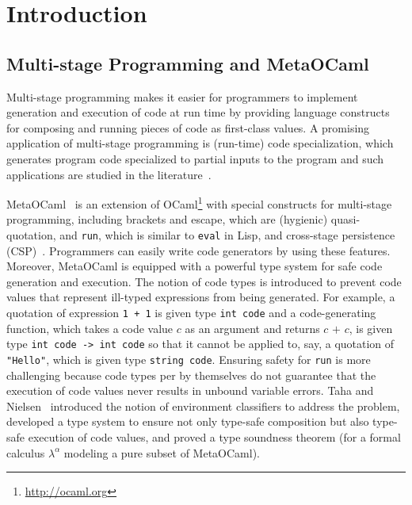 
\section{Introduction}
\label{sec:intro}

\subsection{Multi-stage Programming and MetaOCaml}

Multi-stage programming makes it easier for programmers to implement
generation and execution of code at run time by providing language
constructs for composing and running pieces of code as first-class
values.  A promising application of multi-stage programming is
(run-time) code specialization, which generates program code
specialized to partial inputs to the program and such applications are
studied in the literature~\cite{8384206,mainland2012metahaskell,taha2007gentle}.

MetaOCaml~\cite{calcagno2003implementing,oleg2014} is an extension of
OCaml\footnote{\url{http://ocaml.org}} with special constructs for
multi-stage programming, including brackets and escape, which are
(hygienic) quasi-quotation, and \texttt{run}, which is similar to
\texttt{eval} in Lisp, and cross-stage persistence
(CSP)~\cite{MetaML}.  Programmers can easily write code generators by
using these features.  Moreover, MetaOCaml is equipped with a powerful
type system for safe code generation and execution.  The notion of
code types is introduced to prevent code values that represent
ill-typed expressions from being generated.  For example, a quotation
of expression \texttt{1 + 1} is given type \texttt{int code}
and a code-generating function, which takes a code value \(c\) as an
argument and returns \(c \texttt{ + } c\), is given type \texttt{int
  code -> int code} so that it cannot be applied to, say, a quotation
of \texttt{"Hello"}, which is given type \texttt{string
  code}.  Ensuring safety for \verb|run| is more challenging because
code types per by themselves do not guarantee that the execution of code values never
results in unbound variable errors.  Taha and
Nielsen~\cite{taha2003environment} introduced the notion of
environment classifiers to address the problem, developed a type
system to ensure not only type-safe composition but also type-safe
execution of code values, and proved a type soundness theorem (for a formal calculus \(\lambda^\alpha\) modeling a pure subset of MetaOCaml).


